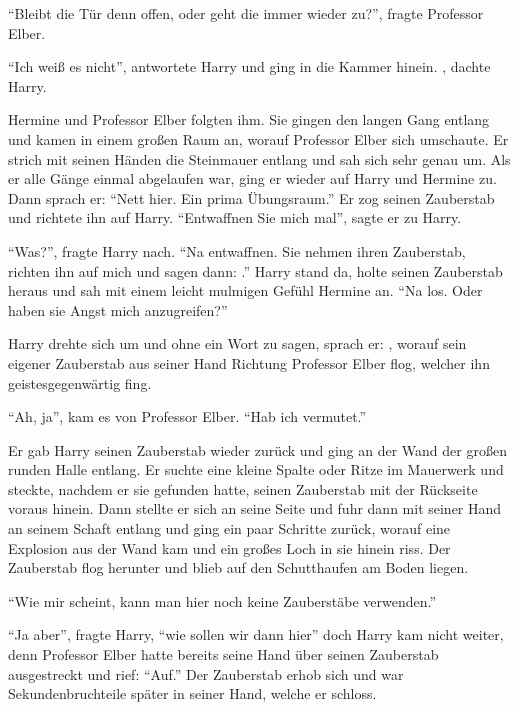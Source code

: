 \enquote{Bleibt die Tür denn offen, oder geht die immer wieder zu?}, fragte Professor Elber.

\enquote{Ich weiß es nicht}, antwortete Harry und ging in die Kammer hinein. , dachte Harry.

Hermine und Professor Elber folgten ihm. Sie gingen den langen Gang entlang und kamen in einem großen Raum an, worauf Professor Elber sich umschaute. Er strich mit seinen Händen die Steinmauer entlang und sah sich sehr genau um. Als er alle Gänge einmal abgelaufen war, ging er wieder auf Harry und Hermine zu. Dann sprach er: \enquote{Nett hier. Ein prima Übungsraum.} Er zog seinen Zauberstab und richtete ihn auf Harry. \enquote{Entwaffnen Sie mich mal}, sagte er zu Harry.

\enquote{Was?}, fragte Harry nach. \enquote{Na entwaffnen. Sie nehmen ihren Zauberstab, richten ihn auf mich und sagen dann: .} Harry stand da, holte seinen Zauberstab heraus und sah mit einem leicht mulmigen Gefühl Hermine an. \enquote{Na los. Oder haben sie Angst mich anzugreifen?}

Harry drehte sich um und ohne ein Wort zu sagen, sprach er: , worauf sein eigener Zauberstab aus seiner Hand Richtung Professor Elber flog, welcher ihn geistesgegenwärtig fing.

\enquote{Ah, ja}, kam es von Professor Elber. \enquote{Hab ich vermutet.}

Er gab Harry seinen Zauberstab wieder zurück und ging an der Wand der großen runden Halle entlang. Er suchte eine kleine Spalte oder Ritze im Mauerwerk und steckte, nachdem er sie gefunden hatte, seinen Zauberstab mit der Rückseite voraus hinein. Dann stellte er sich an seine Seite und fuhr dann mit seiner Hand an seinem Schaft entlang und ging ein paar Schritte zurück, worauf eine Explosion aus der Wand kam und ein großes Loch in sie hinein riss. Der Zauberstab flog herunter und blieb auf den Schutthaufen am Boden liegen.

\enquote{Wie mir scheint, kann man hier noch keine Zauberstäbe verwenden.}

\enquote{Ja aber}, fragte Harry, \enquote{wie sollen wir dann hier\abs} doch Harry kam nicht weiter, denn Professor Elber hatte bereits seine Hand über seinen Zauberstab ausgestreckt und rief: \enquote{Auf.} Der Zauberstab erhob sich und war Sekundenbruchteile später in seiner Hand, welche er schloss.

